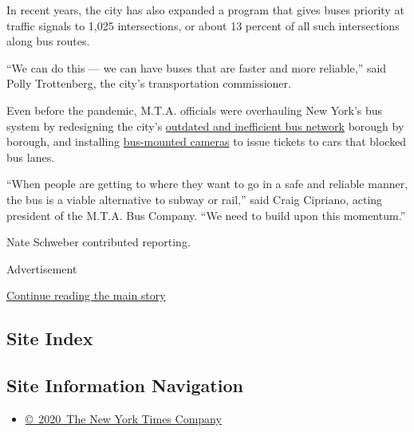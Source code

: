 In recent years, the city has also expanded a program that gives buses
priority at traffic signals to 1,025 intersections, or about 13 percent
of all such intersections along bus routes.

``We can do this --- we can have buses that are faster and more
reliable,'' said Polly Trottenberg, the city's transportation
commissioner.

Even before the pandemic, M.T.A. officials were overhauling New York's
bus system by redesigning the city's
\href{https://www.nytimes3xbfgragh.onion/2018/08/28/nyregion/bus-routes-nyc-transit.html}{outdated
and inefficient bus network} borough by borough, and installing
\href{http://www.mta.info/press-release/nyc-transit/mta-bus-mounted-camera-program-begins-issuing-bus-lane-violations-m15-sbs}{bus-mounted
cameras} to issue tickets to cars that blocked bus lanes.

``When people are getting to where they want to go in a safe and
reliable manner, the bus is a viable alternative to subway or rail,''
said Craig Cipriano, acting president of the M.T.A. Bus Company. ``We
need to build upon this momentum.''

Nate Schweber contributed reporting.

Advertisement

\protect\hyperlink{after-bottom}{Continue reading the main story}

\hypertarget{site-index}{%
\subsection{Site Index}\label{site-index}}

\hypertarget{site-information-navigation}{%
\subsection{Site Information
Navigation}\label{site-information-navigation}}

\begin{itemize}
\tightlist
\item
  \href{https://help.nytimes3xbfgragh.onion/hc/en-us/articles/115014792127-Copyright-notice}{©~2020~The
  New York Times Company}
\end{itemize}

